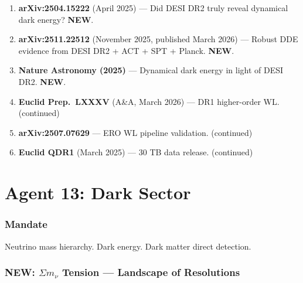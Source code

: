 \documentclass[11pt,a4paper]{article}
\newcommand{\NEW}{\textcolor{dfdblue}{\textbf{NEW}}}
\begin{document}
\begin{enumerate}
\item \textbf{arXiv:2504.15222} (April 2025) --- Did DESI DR2 truly reveal dynamical dark energy? \NEW.
\item \textbf{arXiv:2511.22512} (November 2025, published March 2026) --- Robust DDE evidence from DESI DR2 + ACT + SPT + Planck. \NEW.
\item \textbf{Nature Astronomy (2025)} --- Dynamical dark energy in light of DESI DR2. \NEW.
\item \textbf{Euclid Prep.\ LXXXV} (A\&A, March 2026) --- DR1 higher-order WL. (continued)
\item \textbf{arXiv:2507.07629} --- ERO WL pipeline validation. (continued)
\item \textbf{Euclid QDR1} (March 2025) --- 30 TB data release. (continued)
\end{enumerate}


\part{Agent 13: Dark Sector}
\label{part:agent13}

\section{Mandate}

Neutrino mass hierarchy. Dark energy. Dark matter direct detection.

\section{\NEW: $\Sigma m_\nu$ Tension --- Landscape of Resolutions}
\end{document}
